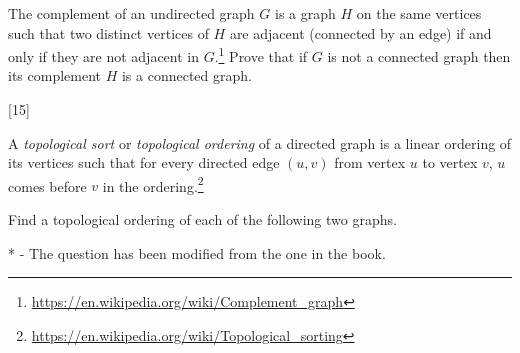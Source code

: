 \documentclass[addpoints]{exam}
\begin{document}
\begin{questions}
  The complement of an undirected graph $G$ is a graph $H$ on the same vertices such that two distinct vertices of $H$ are adjacent (connected by an edge) if and only if they are not adjacent in $G$.\footnote{\url{https://en.wikipedia.org/wiki/Complement_graph}} Prove that if $G$ is not a connected graph then its complement $H$ is a connected graph.
  \begin{solution}
  \end{solution}

  [15]

  A {\it topological sort} or {\it topological ordering} of a directed graph is a linear ordering of its vertices such that for every directed edge $(u,v)$ from vertex $u$ to vertex $v$, $u$ comes before $v$ in the ordering.\footnote{\url{https://en.wikipedia.org/wiki/Topological_sorting}}

  Find a topological ordering of each of the following two graphs.

  
\end{questions}

* - The question has been modified from the one in the book.
\end{document}
